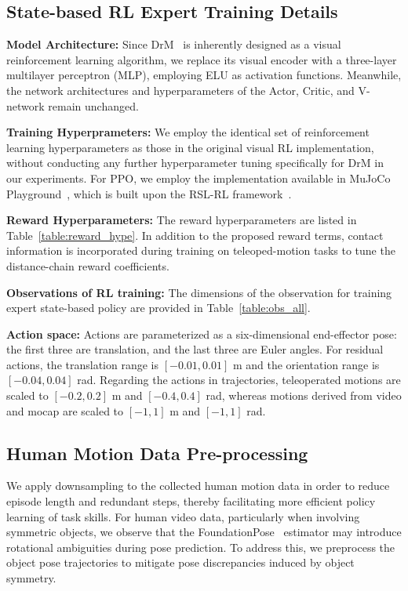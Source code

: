 \newpage
\appendix
\subsection{State-based RL Expert Training Details}
\label{sec:state-rl}
\textbf{Model Architecture:} Since DrM~\cite{xudrm} is inherently designed as a visual reinforcement learning algorithm, we replace its visual encoder with a three-layer multilayer perceptron (MLP), employing ELU as activation functions. Meanwhile, the network architectures and hyperparameters of the Actor, Critic, and V-network remain unchanged.

\textbf{Training Hyperprameters:} We employ the identical set of reinforcement learning hyperparameters as those in the original visual RL implementation, without conducting any further hyperparameter tuning specifically for DrM in our experiments. For PPO, we employ the implementation available in MuJoCo Playground~\cite{mujoco_playground_2025}, which is built upon the RSL-RL framework~\cite{rudin2022learning}.


\textbf{Reward Hyperparameters:} The reward hyperparameters are listed in Table~\ref{table:reward_hype}. In addition to the proposed reward terms, contact information is incorporated during training on teleoped-motion tasks to tune the distance-chain reward coefficients.


\textbf{Observations of RL training:} The dimensions of the observation for training expert state-based policy are provided in Table~\ref{table:obs_all}. 


\textbf{Action space:} Actions are parameterized as a six-dimensional end-effector pose: the first three are translation, and the last three are Euler angles. For residual actions,  the translation range is $[-0.01, 0.01]$ m and the orientation range is $[-0.04, 0.04]$ rad. Regarding the actions in trajectories, teleoperated motions are scaled to $[-0.2, 0.2]$ m and $[-0.4, 0.4]$ rad, whereas motions derived from video and mocap are scaled to $[-1, 1]$ m and $[-1, 1]$ rad. 

\subsection{Human Motion Data Pre-processing}
We apply downsampling to the collected human motion data in order to reduce episode length and redundant steps, thereby facilitating more efficient policy learning of task skills. For human video data, particularly when involving symmetric objects, we observe that the FoundationPose~\cite{wen2024foundationpose} estimator may introduce rotational ambiguities during pose prediction. To address this, we preprocess the object pose trajectories to mitigate pose discrepancies induced by object symmetry.


